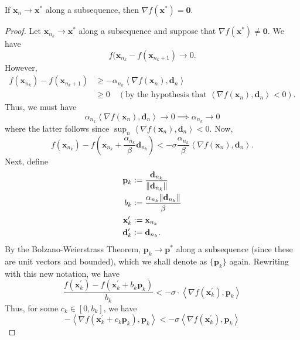 \begin{thm}
    If $\mathbf{x}_n \to \mathbf{x}^*$ along a subsequence, then $\nabla f(\mathbf{x}^*) = \mathbf{0}$.
\end{thm}
\begin{proof}
    Let $\mathbf{x}_{n_k} \to \mathbf{x}^*$ along a subsequence and suppose that $\nabla f(\mathbf{x}^*) \neq \mathbf{0}$. We have
    \[
        f(\mathbf{x}_{n_k} - f(\mathbf{x}_{n_k + 1}) \to 0.
    \]
    However, 
    \begin{align*}
        f(\mathbf{x}_{n_k}) - f(\mathbf{x}_{n_k + 1}) &\geq -\alpha_{n_k} \left\langle \nabla f(\mathbf{x}_n), \mathbf{d}_n \right\rangle \\
        &\geq 0 \quad (\text{by the hypothesis that } \left\langle \nabla f(\mathbf{x}_n), \mathbf{d}_n \right\rangle < 0).
    \end{align*}
    Thus, we must have
    \[
        \alpha_{n_k} \left\langle \nabla f(\mathbf{x}_n), \mathbf{d}_n \right\rangle \to 0 \implies \alpha_{n_k} \to 0
    \]
    where the latter follows since $\sup_n \left\langle \nabla f(\mathbf{x}_n), \mathbf{d}_n \right\rangle < 0$. Now,
    \[
        f(\mathbf{x}_{n_k}) - f\left( \mathbf{x}_{n_k} + \frac{\alpha_{n_k}}{\beta}\mathbf{d}_{n_k} \right) < -\sigma  \frac{\alpha_{n_k}}{\beta} \left\langle \nabla f(\mathbf{x}_n), \mathbf{d}_n \right\rangle.
    \]
    Next, define
    \begin{align*}
        \mathbf{p}_k &\vcentcolon= \frac{\mathbf{d}_{n_k}}{\norm{\mathbf{d}_{n_k}}} \\  b_k &\vcentcolon= \frac{\alpha_{n_k} \norm{\mathbf{d}_{n_k}}}{\beta} \\
        \mathbf{x}^{\prime}_k &\vcentcolon= \mathbf{x}_{n_k} \\
        \mathbf{d}^{\prime}_k &\vcentcolon= \mathbf{d}_{n_k}.
    \end{align*}
    By the Bolzano-Weierstrass Theorem, $\mathbf{p}_k \to \mathbf{p}^*$ along a subsequence (since these are unit vectors and bounded), which we shall denote as $\{\mathbf{p}_k\}$ again. Rewriting with this new notation, we have
    \[
        \frac{f(\mathbf{x}^{\prime}_k) - f\left( \mathbf{x}^{\prime}_k + b_k \mathbf{p}_k \right)}{b_k} < -\sigma \cdot \left\langle \nabla f(\mathbf{x}^{\prime}_k), \mathbf{p}_k \right\rangle
    \]
    Thus, for some $c_k \in [0,b_k]$, we have
    \[
        -\left\langle \nabla f(\mathbf{x}^{\prime}_k + c_k \mathbf{p}_k), \mathbf{p}_k \right\rangle < -\sigma \left\langle \nabla f(\mathbf{x}^{\prime}_k), \mathbf{p}_k \right\rangle
\]
\end{proof}
